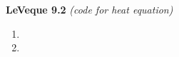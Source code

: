 \textbf{LeVeque 9.2} \textit{(code for heat equation)}

\begin{enumerate}
  \item 
  \pagebreak
  \item 
\end{enumerate} 
